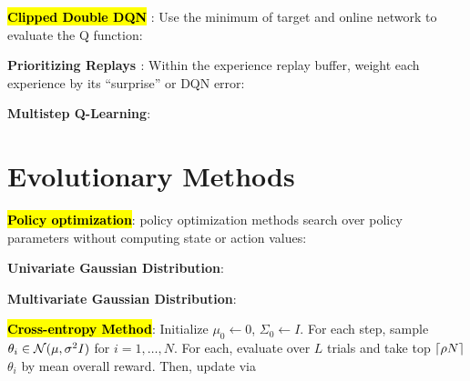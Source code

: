 \documentclass{article}
\begin{document}
  \hl{\textbf{Clipped Double DQN}} \cite{fujimoto2018addressing}: Use the minimum of target and online network to evaluate the Q function:

  \textbf{Prioritizing Replays \cite{schaul2016prioritized}}: Within the experience replay buffer, weight each experience by its ``surprise'' or DQN error:

  \textbf{Multistep Q-Learning}:

\section{Evolutionary Methods}

  \hl{\textbf{Policy optimization}}: policy optimization methods search over policy parameters without computing state or action values:

  \textbf{Univariate Gaussian Distribution}:

  \textbf{Multivariate Gaussian Distribution}:

  \hl{\textbf{Cross-entropy Method}}: Initialize $\mu_0\leftarrow 0$, $\Sigma_0\leftarrow I$. For each step, sample $\theta_i\in\mathcal{N}(\mu,\sigma^2I)$ for $i=1,\dots,N$. For each, evaluate over $L$ trials and take top $\left\lceil \rho N \right\rceil$ $\theta_i$ by mean overall reward. Then, update via
\end{document}

